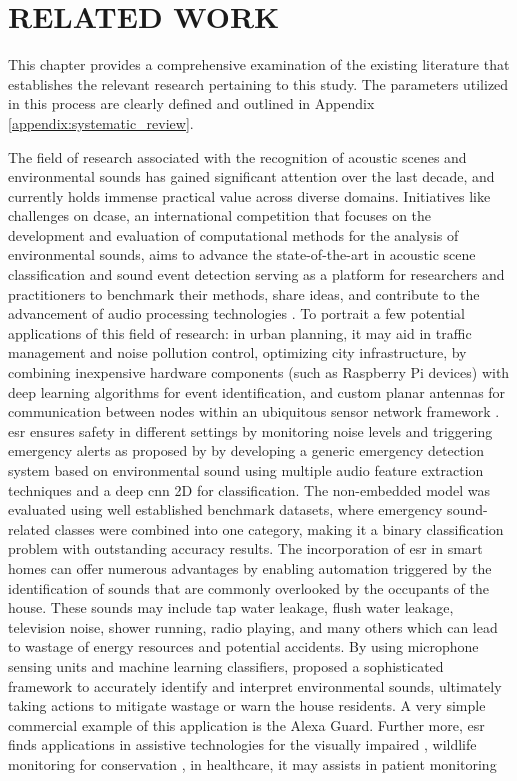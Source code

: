 \chapter{RELATED WORK}
\label{chp:rel}


This chapter provides a comprehensive examination of the existing literature that establishes the relevant research pertaining to this study. The parameters utilized in this process are clearly defined and outlined in Appendix  \ref{appendix:systematic_review}.

The field of research associated with the recognition of acoustic scenes and environmental sounds has gained significant attention over the last decade, and currently holds immense practical value across diverse domains. Initiatives like challenges on \gls{dcase}, an international competition that focuses on the development and evaluation of computational methods for the analysis of environmental sounds, aims to advance the state-of-the-art in acoustic scene classification and sound event detection serving as a platform for researchers and practitioners to benchmark their methods, share ideas, and contribute to the advancement of audio processing technologies \cite{Mesaros2019}. To portrait a few potential applications of this field of research: in urban planning, it may aid in traffic management and noise pollution control, optimizing city infrastructure, by combining inexpensive hardware components (such as Raspberry Pi devices) with deep learning algorithms for event identification, and custom planar antennas for communication between nodes within an ubiquitous sensor network framework \cite{VidaaVila2020}. \gls{esr} ensures safety in different settings by monitoring noise levels and triggering emergency alerts as proposed by \textcite{Sharma2021} by developing a generic emergency detection system based on environmental sound using multiple audio feature extraction techniques and a deep \gls{cnn} 2D for classification. The non-embedded model was evaluated using well established benchmark datasets, where emergency sound-related classes were combined into one category, making it a binary classification problem with outstanding accuracy results. The incorporation of \gls{esr} in smart homes can offer numerous advantages by enabling automation triggered by the identification of sounds that are commonly overlooked by the occupants of the house. These sounds may include tap water leakage, flush water leakage, television noise, shower running, radio playing, and many others which can lead to wastage of energy resources and potential accidents. By using microphone sensing units and machine learning classifiers, \textcite{Pandya2021} proposed a sophisticated framework to accurately identify and interpret environmental sounds, ultimately taking actions to mitigate wastage or warn the house residents. A very simple commercial example of this application is the Alexa Guard. Further more, \gls{esr} finds applications in assistive technologies for the visually impaired \cite{Huang2023}, wildlife monitoring for conservation \cite{Jeantet2023}, in healthcare, it may assists in patient monitoring \cite{Fukuyama2022} 